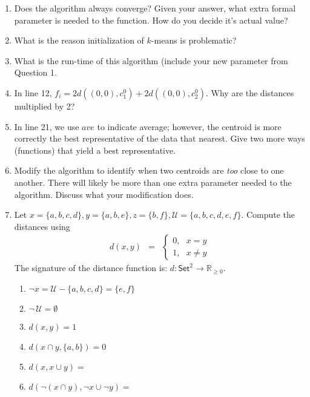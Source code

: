 \documentclass{article}
\begin{document}
\begin{enumerate}
\item Does the algorithm always converge? Given your answer, what extra formal parameter is needed  to the function.  How do you decide it's actual value?
\item What is the reason initialization of $k$-means is problematic?
\item What is the run-time of this algorithm (include your new parameter from Question 1.
\item In line 12, $f_i = 2d((0,0), c_1^0) + 2d((0,0), c_2^0)$.  Why are the distances multiplied by 2?
\item In line 21, we use $ave$ to indicate average; however, the centroid is more correctly the best representative of the data that nearest.  Give two more ways (functions) that yield a best representative.
\item Modify the algorithm to identify when two centroids are {\it too} close to one another.   There will likely be more than one extra parameter needed to the algorithm.  Discuss what your modification does.

\item Let  $x = \{a,b,c,d\}, y = \{a, b, e\}, z = \{b, f\}, \mathcal{U} = \{a,b,c,d,e,f\}$.  Compute the distances using \begin{eqnarray}\label{foo}  d(x,y) &=& \left\{\begin{array}{l} 0,\ \ \ x = y \\ 1,\ \ \  x\neq y \end{array}\right. \end{eqnarray}\label{foo}
The signature of the distance function is: $d:\mathsf{Set}^2 \rightarrow \mathbb{R}_{\geq 0}$.
\begin{enumerate}
\item $\neg x = \mathcal{U} - \{a,b,c,d\} = \{e,f\}$
\item $\neg\, \mathcal{U} = \emptyset$
\item $d(x,y) = 1$
\item $d(x\cap y, \{a, b\}) = 0$
\item $d(x, x \cup y) =$
\item $d(\neg(x \cap y), \neg x \cup \neg y) =$
\end{enumerate}


\end{enumerate}
\end{document}
